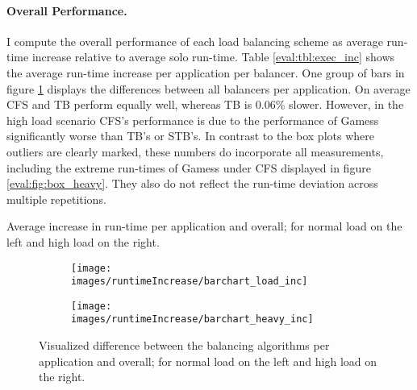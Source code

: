\paragraph{Overall Performance.}
I compute the overall performance of each load balancing scheme as average
run-time increase relative to average solo run-time.
Table \ref{eval:tbl:exec_inc} shows the average run-time increase per
application per balancer.
One group of bars in figure \ref{eval:fig:exec_inc} displays the differences
between all balancers per application.
On average CFS and TB perform equally well, whereas TB is 0.06\% slower.
However, in the high load scenario CFS's performance is due to the performance
of Gamess significantly worse than TB's or STB's.
In contrast to the box plots where outliers are clearly marked, these numbers
do incorporate all measurements, including the extreme
run-times of Gamess under CFS displayed in figure \ref{eval:fig:box_heavy}.
They also do not reflect the run-time deviation across multiple repetitions.
%
\begin{table}[h!]
  
  \caption{Average increase in run-time per application and overall; for
    normal load on the left and high load on the right.}
  \label{eval:tbl:exec_inc}
\end{table}
%
\begin{figure}[h!]
  \begin{subfigure}{.49\textwidth}
  \texttt{[image: images/runtimeIncrease/barchart\_load\_inc]}
  \end{subfigure}
  \begin{subfigure}{.49\textwidth}
  \texttt{[image: images/runtimeIncrease/barchart\_heavy\_inc]}
  \end{subfigure}
  \caption{Visualized difference between the balancing algorithms per
    application and overall; for normal load on the left and high load on the
    right.}
  \label{eval:fig:exec_inc}
\end{figure}
